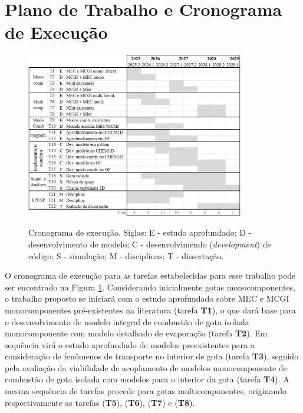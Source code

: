 \section{Plano de Trabalho e Cronograma de Execução}


\begin{figure}[ht]
    \centering
    \caption{Cronograma de execução. Siglas: E - estudo aprofundado; D - desenvolvimento de modelo; C - desenvolvimendo (\emph{development}) de código; S - simulação; M - disciplinas; T - dissertação.}
    \includegraphics[width=0.85\textwidth]{30_images/cronograma-3.png}
    \label{fig:cronograma}
\end{figure}


O cronograma de execução para as tarefas estabelecidas para esse trabalho pode ser encontrado na Figura \ref{fig:cronograma}.
Considerando inicialmente gotas monocomponentes, o trabalho proposto se iniciará com o estudo aprofundado sobre MEC e MCGI monocomponentes pré-existentes na literatura (tarefa \textbf{T1}), o que dará base para o desenvolvimento de modelo integral de combustão de gota isolada monocomponente com modelo detalhado de evaporação (tarefa \textbf{T2}).
Em sequência virá o estudo aprofundado de modelos preexistentes para a consideração de fenômenos de transporte no interior de gota (tarefa \textbf{T3}), seguido pela avaliação da viabilidade de acoplamento de modelos monocomponente de combustão de gota isolada com modelos para o interior da gota (tarefa \textbf{T4}).
A mesma sequência de tarefas procede para gotas multicomponentes, originando respectivamente as tarefas (\textbf{T5}), (\textbf{T6}), (\textbf{T7}) e (\textbf{T8}). 

